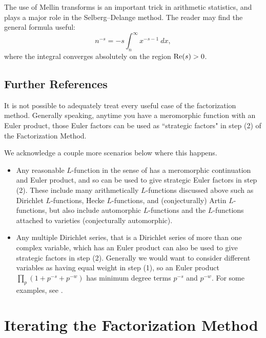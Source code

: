 \documentclass[12pt]{amsart}
\theoremstyle{plain}
\begin{document}
The use of Mellin transforms is an important trick in arithmetic statistics, and plays a major role in the Selberg--Delange method. The reader may find the general formula useful:
\[
n^{-s} = -s\int_n^{\infty} x^{-s-1}\ dx,
\]
where the integral converges absolutely on the region ${\rm Re}(s) >0$.





\subsection{Further References} It is not possible to adequately treat every useful case of the factorization method. Generally speaking, anytime you have a meromorphic function with an Euler product, those Euler factors can be used as ``strategic factors" in step (2) of the Factorization Method.

We acknowledge a couple more scenarios below where this happens.

\begin{itemize}
    \item Any reasonable $L$-function in the sense of \cite[Section 5.1]{iwaniec-kowalski2004} has a meromorphic continuation and Euler product, and so can be used to give strategic Euler factors in step (2). These include many arithmetically $L$-functions discussed above such as Dirichlet $L$-functions, Hecke $L$-functions, and (conjecturally) Artin $L$-functions, but also include automorphic $L$-functions and the $L$-functions attached to varieties (conjecturally automorphic).

    \item Any multiple Dirichlet series, that is a Dirichlet series of more than one complex variable, which has an Euler product can also be used to give strategic factors in step (2). Generally we would want to consider different variables as having equal weight in step (1), so an Euler product $\prod_p (1+p^{-s} + p^{-w})$ has minimum degree terms $p^{-s}$ and $p^{-w}$. For some examples, see \cite{bhowmik_essouabri_lichtin_2007,delabarre_2013,delabarre2014}.
\end{itemize}





\section{Iterating the Factorization Method}\label{sec:iterating_factorization_method}
\end{document}
